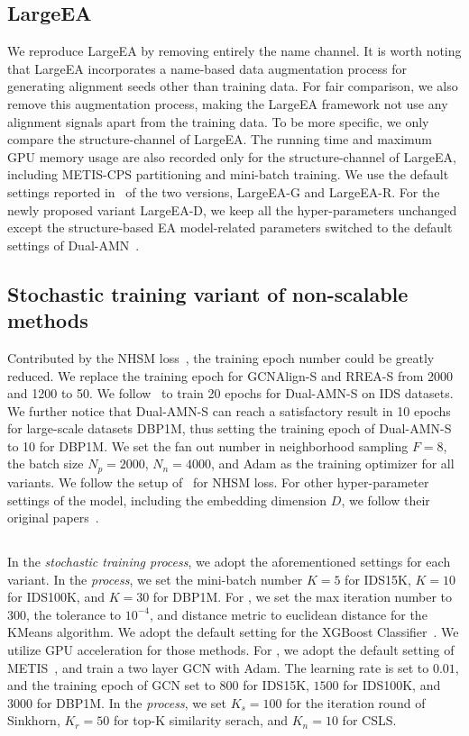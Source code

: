 \subsection{LargeEA} We reproduce LargeEA by removing entirely the name channel. It is worth noting that LargeEA incorporates a name-based data augmentation process for generating alignment seeds other than training data. For fair comparison, we also remove this augmentation process, making the LargeEA framework not use any alignment signals apart from the training data. To be more specific, we only compare the structure-channel of LargeEA. The running time and maximum GPU memory usage are also recorded only for the structure-channel of LargeEA, including METIS-CPS partitioning and mini-batch training. We use the default settings reported in~\cite{LargeEA22} of the two versions, LargeEA-G and LargeEA-R. For the newly proposed variant LargeEA-D, we keep all the hyper-parameters unchanged except the structure-based EA model-related parameters switched to the default settings of Dual-AMN~\cite{DualAMN21}.

\subsection{Stochastic training variant of non-scalable methods} Contributed by the NHSM loss~\cite{DualAMN21}, the training epoch number could be greatly reduced. We replace the training epoch for GCNAlign-S and RREA-S from 2000 and 1200 to 50. We follow~\cite{DualAMN21} to train 20 epochs for Dual-AMN-S on IDS datasets. We further notice that Dual-AMN-S can reach a satisfactory result in 10 epochs for large-scale datasets DBP1M, thus setting the training epoch of Dual-AMN-S to 10 for DBP1M.
We set the fan out number in neighborhood sampling $F=8$, the batch size $N_p = 2000$, $N_n = 4000$, and Adam as the training optimizer for all variants. We follow the setup of~\cite{DualAMN21} for NHSM loss.
For other hyper-parameter settings of the model, including the embedding dimension $D$, we follow their original papers~\cite{GCN-Align18,RREA20, DualAMN21}.

\subsection{\ClusterEA{}}
In the \emph{stochastic training process}, we adopt the aforementioned settings for each \ClusterEA{} variant. In the \emph{\Sampling{} process}, we set the mini-batch number $K = 5$ for IDS15K, $K = 10$ for IDS100K, and $K = 30$ for DBP1M. For \KMeans{}, we set the max iteration number to $300$, the tolerance to $10^{-4}$, and distance metric to euclidean distance for the KMeans algorithm. We adopt the default setting for the XGBoost Classifier~\cite{XGBoost16}. We utilize GPU acceleration for those methods. For \MetisGCN{}, we adopt the default setting of METIS~\cite{METIS98}, and train a two layer GCN with Adam. The learning rate is set to $0.01$, and the training epoch of GCN set to $800$ for IDS15K, $1500$ for IDS100K, and $3000$ for DBP1M. In the \emph{\Merging{} process}, we set $K_s = 100$ for the iteration round of Sinkhorn, $K_r = 50$ for top-K similarity serach, and $K_n = 10$ for CSLS.




